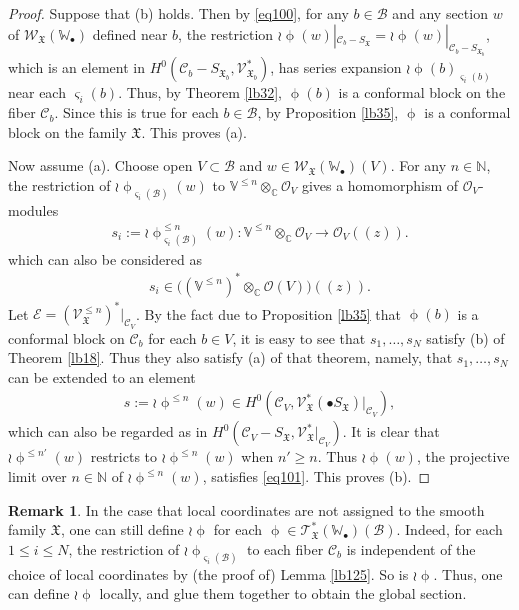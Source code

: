 \documentclass[12pt,a4paper,notitlepage]{report}
\theoremstyle{definition}
\newtheorem{rem}[df]{Remark}
\theoremstyle{plain}
\newcommand{\fk}{\mathfrak}
\newcommand{\mc}{\mathcal}
\newcommand{\scr}{\mathscr}
\newcommand{\sgm}{\varsigma}
\newcommand{\blt}{\bullet}
\newcommand{\Vbb}{\mathbb V}
\newcommand{\Wbb}{\mathbb W}
\newcommand{\Cbb}{\mathbb C}
\newcommand{\Nbb}{\mathbb N}
\numberwithin{equation}{section}
\begin{document}
\begin{proof}
Suppose that (b) holds. Then by \eqref{eq100}, for any $b\in\mc B$ and any section $w$ of $\scr W_{\fk X}(\Wbb_\blt)$ defined near $b$, the restriction $\wr\upphi(w)|_{\mc C_b-S_{\fk X}}=\wr\upphi(w)|_{\mc C_b-S_{\fk X_b}}$, which is an element in $H^0(\mc C_b-S_{\fk X_b},\scr V_{\fk X_b}^*)$, has series expansion 
$\wr\upphi(b)_{\sgm_i(b)}$ near each $\sgm_i(b)$. Thus, by Theorem \ref{lb32}, $\upphi(b)$ is a conformal block on the fiber $\mc C_b$. Since this is true for each $b\in\mc B$, by Proposition \ref{lb35}, $\upphi$ is a conformal block on the family $\fk X$. This proves (a).

Now assume (a). Choose  open $V\subset \mc B$ and $w\in\scr W_{\fk X}(\Wbb_\blt)(V)$. For any $n\in\Nbb$, the restriction of $\wr\upphi_{\sgm_i(\mc B)}(w)$ to $\Vbb^{\leq n}\otimes_\Cbb\scr O_V$ gives a homomorphism of $\scr O_V$-modules
\begin{align*}
s_i:=\wr\upphi^{\leq n}_{\sgm_i(\mc B)}(w):\Vbb^{\leq n}\otimes_\Cbb\scr O_V\rightarrow\scr O_V((z)).
\end{align*}
which can also be considered as
\begin{align*}
s_i\in\big((\Vbb^{\leq n})^*\otimes_\Cbb\scr O(V)\big)((z)).
\end{align*}
Let $\scr E=(\scr V_{\fk X}^{\leq n})^*|_{\mc C_V}$. By the fact due to Proposition \ref{lb35} that $\upphi(b)$ is a conformal block on $\mc C_b$ for each $b\in V$, it is easy to see that  $s_1,\dots,s_N$ satisfy (b) of Theorem \ref{lb18}. Thus they also satisfy (a) of that theorem, namely, that $s_1,\dots,s_N$ can be extended to an element
\begin{align*}
s:=\wr\upphi^{\leq n}(w)\in H^0(\mc C_V,\scr V_{\fk X}^*(\blt S_{\fk X})|_{\mc C_V}),
\end{align*}
which can also be regarded as in $H^0(\mc C_V-S_{\fk X},\scr V_{\fk X}^*|_{\mc C_V})$. It is clear that $\wr\upphi^{\leq n'}(w)$ restricts to $\wr\upphi^{\leq n}(w)$ when $n'\geq n$. Thus $\wr\upphi(w)$, the projective limit over $n\in\Nbb$ of $\wr\upphi^{\leq n}(w)$, satisfies \eqref{eq101}. This proves (b).
\end{proof}


\begin{rem}
In the case that local coordinates are not assigned to the smooth family $\fk X$, one can still define $\wr\upphi$ for each $\upphi\in\scr T_{\fk X}^*(\Wbb_\blt)(\mc B)$. Indeed, for each $1\leq i\leq N$,  the restriction of $\wr\upphi_{\sgm_i(\mc B)}$ to each fiber $\mc C_b$ is independent of the choice of local coordinates by (the proof of) Lemma \ref{lb125}. So is $\wr\upphi$. Thus, one can define $\wr\upphi$ locally, and glue them together to obtain the global section.
\end{rem}
\end{document}
